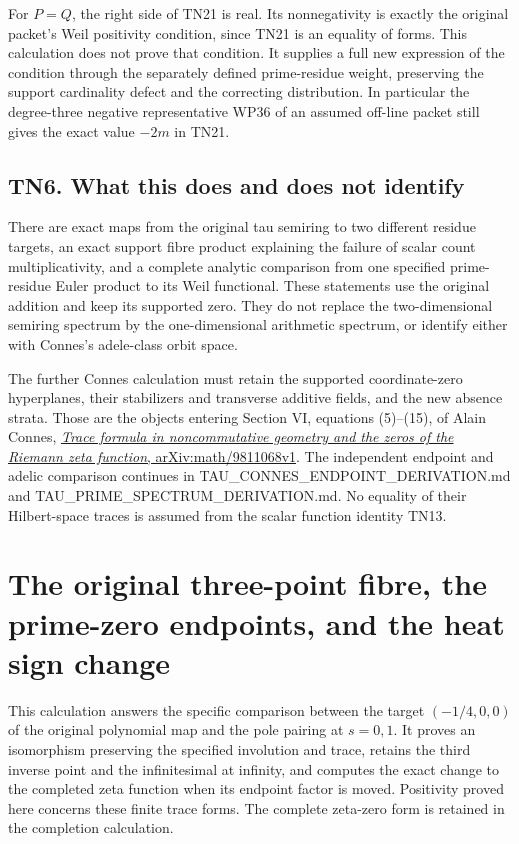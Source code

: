 \documentclass[
  10pt,
  a4paper,
]{article}
\begin{document}
For \(P=Q\), the right side of TN21 is real. Its nonnegativity is
exactly the original packet's Weil positivity condition, since TN21 is
an equality of forms. This calculation does not prove that condition. It
supplies a full new expression of the condition through the separately
defined prime-residue weight, preserving the support cardinality defect
and the correcting distribution. In particular the degree-three negative
representative WP36 of an assumed off-line packet still gives the exact
value \(-2m\) in TN21.

\subsection{TN6. What this does and does not
identify}\label{tn6.-what-this-does-and-does-not-identify}

There are exact maps from the original tau semiring to two different
residue targets, an exact support fibre product explaining the failure
of scalar count multiplicativity, and a complete analytic comparison
from one specified prime-residue Euler product to its Weil functional.
These statements use the original addition and keep its supported zero.
They do not replace the two-dimensional semiring spectrum by the
one-dimensional arithmetic spectrum, or identify either with Connes's
adele-class orbit space.

The further Connes calculation must retain the supported coordinate-zero
hyperplanes, their stabilizers and transverse additive fields, and the
new absence strata. Those are the objects entering Section VI, equations
(5)--(15), of Alain Connes,
\href{https://arxiv.org/abs/math/9811068v1}{\emph{Trace formula in
noncommutative geometry and the zeros of the Riemann zeta function},
arXiv:math/9811068v1}. The independent endpoint and adelic comparison
continues in TAU\_CONNES\_ENDPOINT\_DERIVATION.md and
TAU\_PRIME\_SPECTRUM\_DERIVATION.md. No equality of their Hilbert-space
traces is assumed from the scalar function identity TN13.

\clearpage

\section{The original three-point fibre, the prime-zero endpoints, and
the heat sign
change}\label{the-original-three-point-fibre-the-prime-zero-endpoints-and-the-heat-sign-change}

This calculation answers the specific comparison between the target
\((-1/4,0,0)\) of the original polynomial map and the pole pairing at
\(s=0,1\). It proves an isomorphism preserving the specified involution
and trace, retains the third inverse point and the infinitesimal at
infinity, and computes the exact change to the completed zeta function
when its endpoint factor is moved. Positivity proved here concerns these
finite trace forms. The complete zeta-zero form is retained in the
completion calculation.
\end{document}
